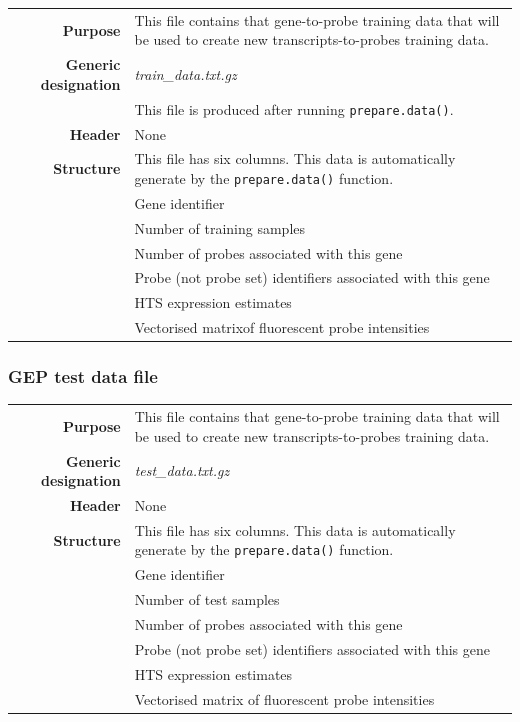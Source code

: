 \documentclass[a4paper,12pt]{article}
\begin{document}
\begin{tabular}{rp{12cm}}
\textbf{Purpose} & This file contains that gene-to-probe training data that will be used to create new transcripts-to-probes training data. \\
\textbf{Generic designation} & \textit{train\_data.txt.gz} \\
  & This file is produced after running \texttt{prepare.data()}. \\
\textbf{Header} & None \\
\textbf{Structure} & This file has six columns. This data is automatically generate by the \texttt{prepare.data()} function. \\
  & Gene identifier \\
  & Number of training samples \\
  & Number of probes associated with this gene \\
  & Probe (not probe set) identifiers associated with this gene \\
  & HTS expression estimates \\
  & Vectorised matrix\footnotemark[1] of fluorescent probe intensities \\
\end{tabular}

\subsubsection{GEP test data file}
\label{tiep:gep_test}

\begin{tabular}{rp{12cm}}
\textbf{Purpose} & This file contains that gene-to-probe training data that will be used to create new transcripts-to-probes training data. \\
\textbf{Generic designation} & \textit{test\_data.txt.gz} \\
\textbf{Header} & None \\
\textbf{Structure} & This file has six columns. This data is automatically generate by the \texttt{prepare.data()} function. \\
  & Gene identifier \\
  & Number of test samples \\
  & Number of probes associated with this gene \\
  & Probe (not probe set) identifiers associated with this gene \\
  & HTS expression estimates \\
  & Vectorised matrix of fluorescent probe intensities
\end{tabular}
\end{document}
